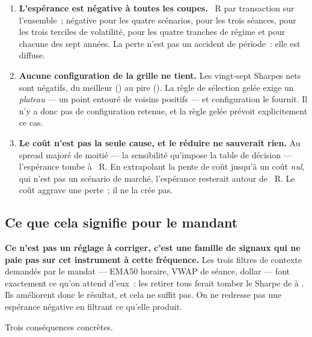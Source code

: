 \begin{enumerate}
\item \textbf{L'espérance est négative à toutes les coupes.}
\XTenExpectancyR{}~R par transaction sur l'ensemble~; négative pour les quatre
scénarios, pour les trois séances, pour les trois terciles de volatilité,
pour les quatre tranches de régime et pour chacune des sept années. La
perte n'est pas un accident de période~: elle est diffuse.

\item \textbf{Aucune configuration de la grille ne tient.} Les vingt-sept
Sharpes nets sont négatifs, du meilleur (\XTenPeakSharpe) au pire
(\XTenWorstGridSharpe). La règle de sélection gelée exige un \emph{plateau} ---
un point entouré de voisins positifs --- et \XTenPlateauPassing{}
configuration le fournit. Il n'y a donc pas de configuration retenue, et la
règle gelée prévoit explicitement ce cas.

\item \textbf{Le coût n'est pas la seule cause, et le réduire ne sauverait
rien.} Au spread majoré de moitié --- la sensibilité qu'impose la table de
décision --- l'espérance tombe à \XTenExpectancySpreadOneFive{}~R. En
extrapolant la pente de coût jusqu'à un coût \emph{nul}, qui n'est pas un
scénario de marché, l'espérance resterait autour de
\XTenZeroCostExtrapolation{}~R. Le coût aggrave une perte~; il ne la crée pas.
\end{enumerate}



\subsection*{Ce que cela signifie pour le mandant}

\begin{insightbox}
\textbf{Ce n'est pas un réglage à corriger, c'est une famille de signaux qui ne
paie pas sur cet instrument à cette fréquence.} Les trois filtres de contexte
demandés par le mandat --- EMA50 horaire, VWAP de séance, dollar --- font
exactement ce qu'on attend d'eux~: les retirer tous ferait tomber le Sharpe de
\XTenSharpeIS{} à \XTenAblationAllOffSharpe. Ils améliorent donc le résultat,
et cela ne suffit pas. On ne redresse pas une espérance négative en filtrant
ce qu'elle produit.
\end{insightbox}

Trois conséquences concrètes.

